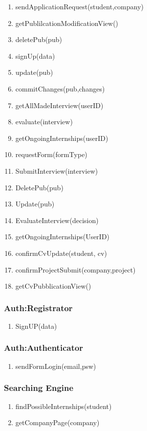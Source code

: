 \documentclass{article}
\begin{document}
\begin{enumerate}
    \item sendApplicationRequest(student,company)
    \item getPublilcationModificationView()
    \item deletePub(pub)
    \item signUp(data)
    \item update(pub)
    \item commitChanges(pub,changes)
    \item getAllMadeInterview(userID)
    \item evaluate(interview)
    \item getOngoingInternships(userID)
    \item requestForm(formType)
    \item SubmitInterview(interview)
    \item DeletePub(pub)
    \item Update(pub)
    \item EvaluateInterview(decision)
    \item getOngoingInternships(UserID)
    \item confirmCvUpdate(student, cv)
    \item confirmProjectSubmit(company,project)
    \item getCvPubblicationView()
\end{enumerate}

\subsubsection{Auth:Registrator}
\begin{enumerate}
    \item SignUP(data)
\end{enumerate}

\subsubsection{Auth:Authenticator}
\begin{enumerate}
    \item sendFormLogin(email,psw)
\end{enumerate}

\subsubsection{Searching Engine}
\begin{enumerate}
    \item findPossibleInternships(student)
    \item getCompanyPage(company)
\end{enumerate}
\end{document}
